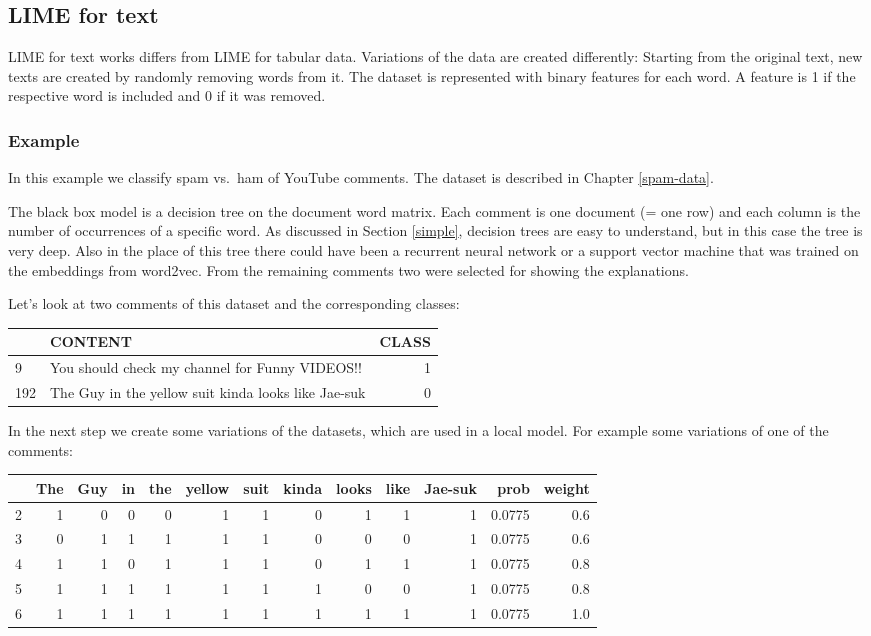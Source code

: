 \documentclass[12pt,]{krantz}
\theoremstyle{definition}
\theoremstyle{definition}
\theoremstyle{definition}
\theoremstyle{remark}
\begin{document}
\subsection{LIME for text}\label{lime-for-text}

LIME for text works differs from LIME for tabular data. Variations of
the data are created differently: Starting from the original text, new
texts are created by randomly removing words from it. The dataset is
represented with binary features for each word. A feature is 1 if the
respective word is included and 0 if it was removed.

\subsubsection{Example}\label{example-5}

In this example we classify spam vs.~ham of YouTube comments. The
dataset is described in Chapter \ref{spam-data}.

The black box model is a decision tree on the document word matrix. Each
comment is one document (= one row) and each column is the number of
occurrences of a specific word. As discussed in Section \ref{simple},
decision trees are easy to understand, but in this case the tree is very
deep. Also in the place of this tree there could have been a recurrent
neural network or a support vector machine that was trained on the
embeddings from word2vec. From the remaining comments two were selected
for showing the explanations.

Let's look at two comments of this dataset and the corresponding
classes:

\begin{tabular}{l|l|r}
\hline
  & CONTENT & CLASS\\
\hline
9 & You should check my channel for Funny VIDEOS!! & 1\\
\hline
192 & The Guy in the yellow suit kinda looks like Jae-suk & 0\\
\hline
\end{tabular}

In the next step we create some variations of the datasets, which are
used in a local model. For example some variations of one of the
comments:

\begin{tabular}{l|r|r|r|r|r|r|r|r|r|r|r|r}
\hline
  & The & Guy & in & the & yellow & suit & kinda & looks & like & Jae-suk & prob & weight\\
\hline
2 & 1 & 0 & 0 & 0 & 1 & 1 & 0 & 1 & 1 & 1 & 0.0775 & 0.6\\
\hline
3 & 0 & 1 & 1 & 1 & 1 & 1 & 0 & 0 & 0 & 1 & 0.0775 & 0.6\\
\hline
4 & 1 & 1 & 0 & 1 & 1 & 1 & 0 & 1 & 1 & 1 & 0.0775 & 0.8\\
\hline
5 & 1 & 1 & 1 & 1 & 1 & 1 & 1 & 0 & 0 & 1 & 0.0775 & 0.8\\
\hline
6 & 1 & 1 & 1 & 1 & 1 & 1 & 1 & 1 & 1 & 1 & 0.0775 & 1.0\\
\hline
\end{tabular}
\end{document}

